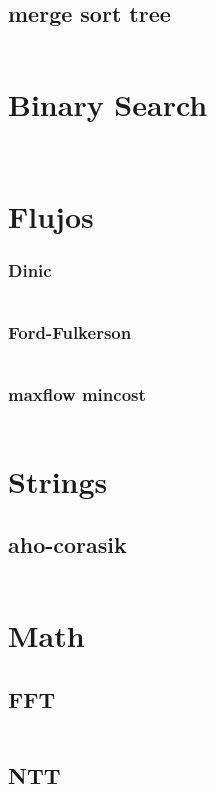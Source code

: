 \documentclass[10pt]{article}
\begin{document}
				\subsection{merge sort tree}
					\inputminted[tabsize=2,breaklines,fontsize=\small]{c++}{DataStructures/mergeSortTree.cpp}
			\section{Binary Search}
				\inputminted[tabsize=2,breaklines,fontsize=\small]{c++}{algorithms/binarySearch.cpp}
				\inputminted[tabsize=2,breaklines,fontsize=\small]{c++}{algorithms/ternarySearch.cpp}
			\section{Flujos}
				\subsubsection{Dinic}
					\inputminted[tabsize=2,breaklines,fontsize=\small]{c++}{Flows/Dinic.cpp}
				\subsubsection{Ford-Fulkerson}
					\inputminted[tabsize=2,breaklines,fontsize=\small]{c++}{Flows/Ford-Fulkerson.cpp}
				\subsubsection{maxflow mincost}
					\inputminted[tabsize=2,breaklines,fontsize=\small]{c++}{Flows/mincostMaxflow.cpp}
			\section{Strings}
				\subsection{aho-corasik}
					\inputminted[tabsize=2,breaklines,fontsize=\small]{c++}{Strings/Aho-corasik.cpp}
			\section{Math}
				\subsection{FFT}
					\inputminted[tabsize=2,breaklines,fontsize=\small]{c++}{FFT/FFT.cpp}
				\subsection{NTT}
					\inputminted[tabsize=2,breaklines,fontsize=\small]{c++}{FFT/NTT.cpp}
\end{document}
